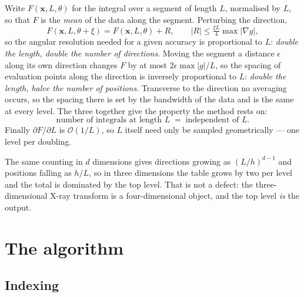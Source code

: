 \documentclass[11pt]{article}
\newcommand{\bx}{\mathbf{x}}
\newcommand{\bigO}{\mathcal{O}}
\begin{document}
Write $F(\bx, L, \theta)$ for the integral over a segment of length $L$,
normalised by $L$, so that $F$ is the \emph{mean} of the data along the segment.
Perturbing the direction,
\begin{equation}
  F(\bx, L, \theta + \xi) = F(\bx, L, \theta) + R,
  \qquad |R| \le \tfrac{\xi L}{4}\max|\nabla g| ,
  \label{eq:angcrit}
\end{equation}
so the angular resolution needed for a given accuracy is proportional to $L$:
\emph{double the length, double the number of directions}. Moving the segment a
distance $\epsilon$ along its own direction changes $F$ by at most
$2\epsilon\max|g|/L$, so the spacing of evaluation points along the direction is
inversely proportional to $L$: \emph{double the length, halve the number of
positions}. Transverse to the direction no averaging occurs, so the spacing
there is set by the bandwidth of the data and is the same at every level. The
three together give the property the method rests on:
\begin{equation}
  \text{number of integrals at length } L \;=\; \text{independent of } L .
  \label{eq:flat}
\end{equation}
Finally $\partial F/\partial L$ is $\bigO(1/L)$, so $L$ itself need only be
sampled geometrically --- one level per doubling.

The same counting in $d$ dimensions gives directions growing as $(L/h)^{d-1}$
and positions falling as $h/L$, so in three dimensions the table grows by two
per level and the total is dominated by the top level. That is not a defect:
the three-dimensional X-ray transform is a four-dimensional object, and the top
level \emph{is} the output.

\section{The algorithm}
\label{sec:algorithm}

\subsection{Indexing}
\label{sec:indexing}
\end{document}
